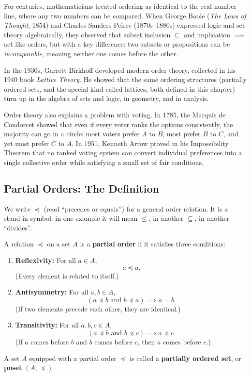 \begin{historybox}
For centuries, mathematicians treated ordering as identical to the real number line, where any two numbers can be compared. When George Boole (\emph{The Laws of Thought}, 1854) and Charles Sanders Peirce (1870s--1880s) expressed logic and set theory algebraically, they observed that subset inclusion $\subseteq$ and implication $\implies$ act like orders, but with a key difference: two subsets or propositions can be \emph{incomparable}, meaning neither one comes before the other.

In the 1930s, Garrett Birkhoff developed modern order theory, collected in his 1940 book \emph{Lattice Theory}. He showed that the same ordering structures (partially ordered sets, and the special kind called lattices, both defined in this chapter) turn up in the algebra of sets and logic, in geometry, and in analysis.

Order theory also explains a problem with voting. In 1785, the Marquis de Condorcet showed that even if every voter ranks the options consistently, the majority can go in a circle: most voters prefer $A$ to $B$, most prefer $B$ to $C$, and yet most prefer $C$ to $A$. In 1951, Kenneth Arrow proved in his Impossibility Theorem that no ranked voting system can convert individual preferences into a single collective order while satisfying a small set of fair conditions.
\end{historybox}

\subsection{Partial Orders: The Definition}

We write $\preceq$ (read ``precedes or equals'') for a general order relation. It is a stand-in symbol: in one example it will mean $\le$, in another $\subseteq$, in another ``divides''.

\begin{definition}
A relation $\preceq$ on a set $A$ is a \textbf{partial order} if it satisfies three conditions:
\begin{enumerate}[label=(\roman*)]
\item \textbf{Reflexivity:} For all $a \in A$,
\[
a \preceq a.
\]
(Every element is related to itself.)
\item \textbf{Antisymmetry:} For all $a, b \in A$,
\[
(a \preceq b \text{ and } b \preceq a) \implies a = b.
\]
(If two elements precede each other, they are identical.)
\item \textbf{Transitivity:} For all $a, b, c \in A$,
\[
(a \preceq b \text{ and } b \preceq c) \implies a \preceq c.
\]
(If $a$ comes before $b$ and $b$ comes before $c$, then $a$ comes before $c$.)
\end{enumerate}
A set $A$ equipped with a partial order $\preceq$ is called a \textbf{partially ordered set}, or \textbf{poset} $(A, \preceq)$.
\end{definition}

